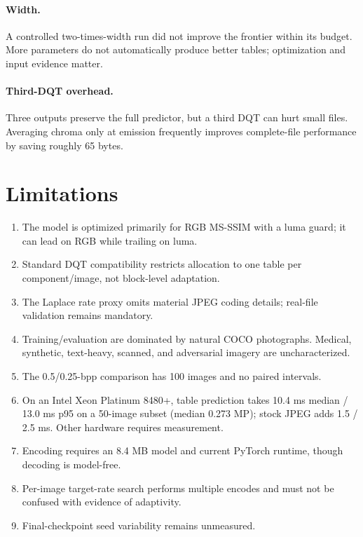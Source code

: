 \documentclass[10pt,twocolumn]{article}
\newcommand{\msssim}{MS-SSIM}
\begin{document}
\paragraph{Width.}
A controlled two-times-width run did not improve the frontier within its budget. More parameters do not automatically produce better tables; optimization and input evidence matter.

\paragraph{Third-DQT overhead.}
Three outputs preserve the full predictor, but a third DQT can hurt small files. Averaging chroma only at emission frequently improves complete-file performance by saving roughly 65 bytes.

\section{Limitations}

\begin{enumerate}
  \item The model is optimized primarily for RGB \msssim{} with a luma guard; it can lead on RGB while trailing on luma.
  \item Standard DQT compatibility restricts allocation to one table per component/image, not block-level adaptation.
  \item The Laplace rate proxy omits material JPEG coding details; real-file validation remains mandatory.
  \item Training/evaluation are dominated by natural COCO photographs. Medical, synthetic, text-heavy, scanned, and adversarial imagery are uncharacterized.
  \item The 0.5/0.25-bpp comparison has 100 images and no paired intervals.
  \item On an Intel Xeon Platinum 8480+, table prediction takes 10.4 ms median / 13.0 ms p95 on a 50-image subset (median 0.273 MP); stock JPEG adds 1.5 / 2.5 ms. Other hardware requires measurement.
  \item Encoding requires an 8.4 MB model and current PyTorch runtime, though decoding is model-free.
  \item Per-image target-rate search performs multiple encodes and must not be confused with evidence of adaptivity.
  \item Final-checkpoint seed variability remains unmeasured.
\end{enumerate}
\end{document}

